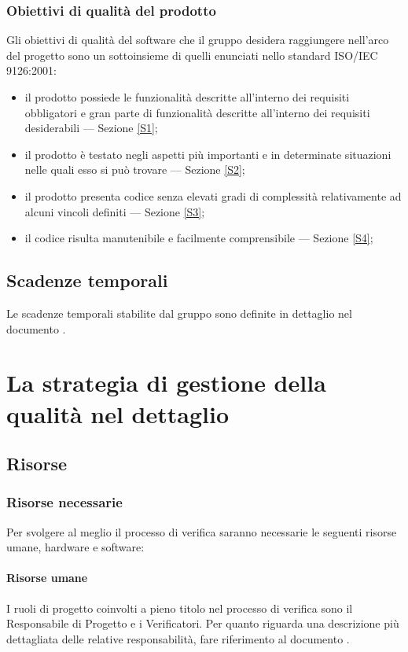 		\subsubsection{Obiettivi di qualità del prodotto}
		Gli obiettivi di qualità del software che il gruppo \hx{} desidera raggiungere nell'arco del progetto sono un sottoinsieme di quelli enunciati nello standard ISO/IEC 9126:2001:
		\begin{itemize}
			\item il prodotto possiede le funzionalità descritte all'interno dei requisiti obbligatori e gran parte di funzionalità descritte all'interno dei requisiti desiderabili --- Sezione \ref{S1};
			\item il prodotto è testato negli aspetti più importanti e in determinate situazioni nelle quali esso si può trovare --- Sezione \ref{S2};
			\item il prodotto presenta codice senza elevati gradi di complessità relativamente ad alcuni vincoli definiti --- Sezione \ref{S3};
			\item il codice risulta manutenibile e facilmente comprensibile --- Sezione \ref{S4};
		\end{itemize}
	\subsection{Scadenze temporali}
	Le scadenze temporali stabilite dal gruppo sono definite in dettaglio nel documento \PdP.
\newpage
\section{La strategia di gestione della qualità nel dettaglio}
	\subsection{Risorse}
		\subsubsection{Risorse necessarie}
		Per svolgere al meglio il processo di verifica saranno necessarie le seguenti risorse umane, hardware e software:
			\paragraph{Risorse umane}
			I ruoli di progetto coinvolti a pieno titolo nel processo di verifica sono il Responsabile di Progetto e i Verificatori. Per quanto riguarda una descrizione più dettagliata delle relative responsabilità, fare riferimento al documento \NdP.
